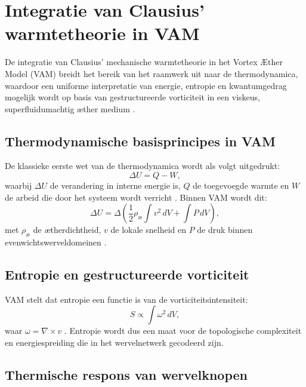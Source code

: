 \section{Integratie van Clausius' warmtetheorie in VAM}\label{sec:appendix_8}

De integratie van Clausius' mechanische warmtetheorie in het Vortex Æther Model (VAM) breidt het bereik van het raamwerk uit naar de thermodynamica,
waardoor een uniforme interpretatie van energie, entropie en kwantumgedrag mogelijk wordt op basis van gestructureerde vorticiteit in een viskeus, superfluïdumachtig æther
medium \cite{clausius1865mechanical, maxwell1865elektromagnetisch, helmholtz1858integralen}.

\subsection{Thermodynamische basisprincipes in VAM}

De klassieke eerste wet van de thermodynamica wordt als volgt uitgedrukt:
\begin{equation}
\Delta U = Q - W,\label{eq:first_law_thermodynamics}
\end{equation}
waarbij $\Delta U$ de verandering in interne energie is, $Q$ de toegevoegde warmte en $W$ de arbeid die door het systeem wordt verricht \cite{clausius1865mechanical}. Binnen VAM wordt dit:
\begin{equation}
\Delta U = \Delta \left( \frac{1}{2} \rho_\text{\ae} \int v^2 \, dV + \int P \, dV \right),\label{eq:first_law_vam}
\end{equation}
met $\rho_\text{\ae}$ de ætherdichtheid, $v$ de lokale snelheid en $P$ de druk binnen evenwichtswerveldomeinen \cite{vam2025unified}.

\subsection{Entropie en gestructureerde vorticiteit}

VAM stelt dat entropie een functie is van de vorticiteitsintensiteit:
\begin{equation}
S \propto \int \omega^2 \, dV,\label{eq:entropy_vorticity}
\end{equation}
waar $\omega = \nabla \times v$ \cite{kelvin1867vortex}. Entropie wordt dus een maat voor de topologische complexiteit en energiespreiding die in het wervelnetwerk gecodeerd zijn.

\subsection{Thermische respons van wervelknopen}

